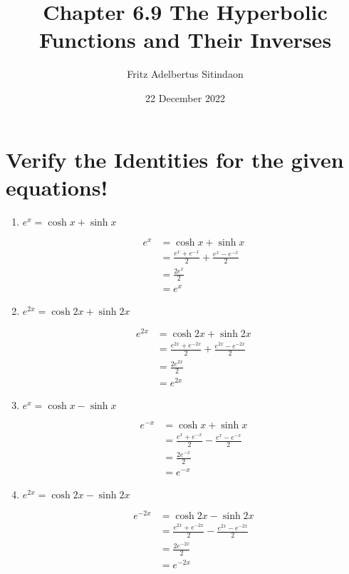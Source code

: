 \documentclass[12pt]{article}
\title{Chapter 6.9 The Hyperbolic Functions and Their Inverses}
\author{Fritz Adelbertus Sitindaon}
\date{22 December 2022}
\begin{document}
\maketitle

\section{Verify the Identities for the given equations!}  
  
\begin{enumerate}
\item $\displaystyle e^x = \cosh x+\sinh x$

\begin{equation*}
  \begin{aligned}
  e^x &= \cosh x+\sinh x\\
  &=\frac{e^x+e^{-x}}{2}+\frac{e^x-e^{-x}}{2}\\
  &=\frac{2e^x}{2}\\
  &=e^x
  \end{aligned}
\end{equation*}

\item $\displaystyle e^{2x} = \cosh2x+\sinh2x$

\begin{equation*}
  \begin{aligned}
  e^{2x} &= \cosh2x+\sinh2x\\
  &=\frac{e^{2x}+e^{-2x}}{2}+\frac{e^{2x}-e^{-2x}}{2}\\
  &=\frac{2e^{2x}}{2}\\
  &=e^{2x}
  \end{aligned}
\end{equation*}

\item $\displaystyle e^x = \cosh x-\sinh x$

\begin{equation*}
  \begin{aligned}
  e^{-x} &= \cosh x+\sinh x\\
  &=\frac{e^x+e^{-x}}{2}-\frac{e^x-e^{-x}}{2}\\
  &=\frac{2e^{-x}}{2}\\
  &=e^{-x}
  \end{aligned}
\end{equation*}

\item $\displaystyle e^{2x} = \cosh2x-\sinh2x$

\begin{equation*}
  \begin{aligned}
  e^{-2x} &= \cosh2x-\sinh2x\\
  &=\frac{e^{2x}+e^{-2x}}{2}-\frac{e^{2x}-e^{-2x}}{2}\\
  &=\frac{2e^{-2x}}{2}\\
  &=e^{-2x}
  \end{aligned}
\end{equation*}


\end{enumerate}
\end{document}
